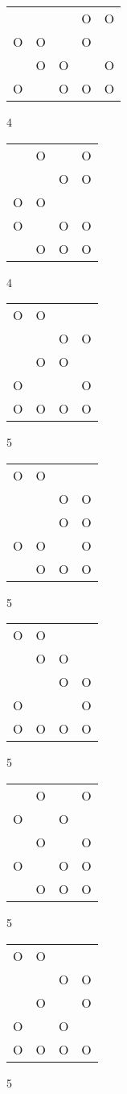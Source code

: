 \begin{tabular}{|m{0.2cm}m{0.2cm}m{0.2cm}m{0.2cm}m{0.2cm}|}\hline
 & & &O&O\\
O&O& &O& \\
 &O&O& &O\\
O& &O&O&O\\
\hline\end{tabular}4
\begin{tabular}{|m{0.2cm}m{0.2cm}m{0.2cm}m{0.2cm}|}\hline
 &O& &O\\
 & &O&O\\
O&O& & \\
O& &O&O\\
 &O&O&O\\
\hline\end{tabular}4
\begin{tabular}{|m{0.2cm}m{0.2cm}m{0.2cm}m{0.2cm}|}\hline
O&O& & \\
 & &O&O\\
 &O&O& \\
O& & &O\\
O&O&O&O\\
\hline\end{tabular}5
\begin{tabular}{|m{0.2cm}m{0.2cm}m{0.2cm}m{0.2cm}|}\hline
O&O& & \\
 & &O&O\\
 & &O&O\\
O&O& &O\\
 &O&O&O\\
\hline\end{tabular}5
\begin{tabular}{|m{0.2cm}m{0.2cm}m{0.2cm}m{0.2cm}|}\hline
O&O& & \\
 &O&O& \\
 & &O&O\\
O& & &O\\
O&O&O&O\\
\hline\end{tabular}5
\begin{tabular}{|m{0.2cm}m{0.2cm}m{0.2cm}m{0.2cm}|}\hline
 &O& &O\\
O& &O& \\
 &O& &O\\
O& &O&O\\
 &O&O&O\\
\hline\end{tabular}5
\begin{tabular}{|m{0.2cm}m{0.2cm}m{0.2cm}m{0.2cm}|}\hline
O&O& & \\
 & &O&O\\
 &O& &O\\
O& &O& \\
O&O&O&O\\
\hline\end{tabular}5
